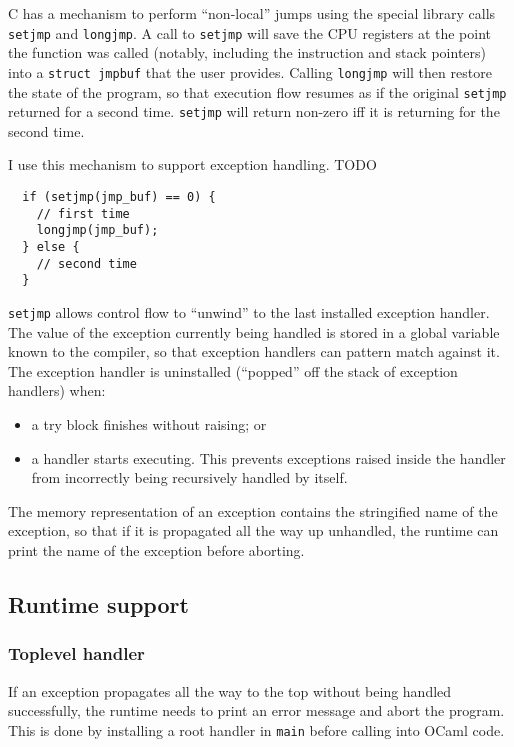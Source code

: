 \documentclass[12pt,a4paper,twoside,openright]{report}
\begin{document}
C has a mechanism to perform ``non-local'' jumps using the special library
calls \lstinline!setjmp! and \lstinline!longjmp!. A call to \lstinline!setjmp!
will save the CPU registers at the point the function was called (notably,
including the instruction and stack pointers) into a \lstinline!struct jmpbuf!
that the user provides. Calling \lstinline!longjmp! will then restore the state
of the program, so that execution flow resumes as if the original
\lstinline!setjmp! returned for a second time. \lstinline!setjmp! will return
non-zero iff it is returning for the second time.

I use this mechanism to support exception handling. TODO

\begin{lstlisting}
  if (setjmp(jmp_buf) == 0) {
    // first time
    longjmp(jmp_buf);
  } else {
    // second time
  }
\end{lstlisting}

\lstinline!setjmp! allows control flow to ``unwind'' to the last installed
exception handler. The value of the exception currently being handled is stored
in a global variable known to the compiler, so that exception handlers can
pattern match against it. The exception handler is uninstalled (``popped'' off
the stack of exception handlers) when:
\begin{itemize}
  \item a try block finishes without raising; or
  \item a handler starts executing. This prevents exceptions raised inside the
      handler from incorrectly being recursively handled by itself.
\end{itemize}

The memory representation of an exception contains the stringified name of the
exception, so that if it is propagated all the way up unhandled, the runtime
can print the name of the exception before aborting.

\subsection{Runtime support}

\subsubsection{Toplevel handler}

If an exception propagates all the way to the top without being handled
successfully, the runtime needs to print an error message and abort the
program. This is done by installing a root handler in \lstinline!main! before
calling into OCaml code.
\end{document}
